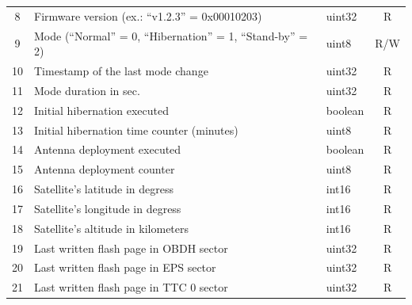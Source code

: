 \begin{longtable}[c]{cL{0.70\textwidth}lc}
	8                    & Firmware version (ex.: ``v1.2.3'' = 0x00010203)                                  & uint32                   & R                   \\
	9                    & Mode (``Normal'' = 0, ``Hibernation'' = 1, ``Stand-by'' = 2)                     & uint8                    & R/W                 \\
	10                   & Timestamp of the last mode change                                                & uint32                   & R                   \\
	11                   & Mode duration in sec.                                                            & uint32                   & R                   \\
	12                   & Initial hibernation executed                                                     & boolean                  & R                   \\
	13                   & Initial hibernation time counter (minutes)                                       & uint8                    & R                   \\
	14                   & Antenna deployment executed                                                      & boolean                  & R                   \\
	15                   & Antenna deployment counter                                                       & uint8                    & R                   \\
    16                   & Satellite's latitude in degress                                                  & int16                    & R                   \\
    17                   & Satellite's longitude in degress                                                 & int16                    & R                   \\
    18                   & Satellite's altitude in kilometers                                               & int16                    & R                   \\
    19                   & Last written flash page in OBDH sector                                           & uint32                   & R                   \\
    20                   & Last written flash page in EPS sector                                            & uint32                   & R                   \\
    21                   & Last written flash page in TTC 0 sector                                          & uint32                   & R                   \\

\end{longtable}
